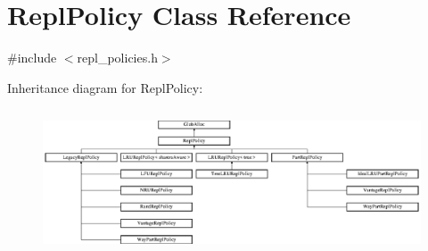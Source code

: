 \hypertarget{classReplPolicy}{\section{Repl\-Policy Class Reference}
\label{classReplPolicy}
}


{\ttfamily \#include $<$repl\-\_\-policies.\-h$>$}

Inheritance diagram for Repl\-Policy\-:\begin{figure}[H]
\begin{center}
\leavevmode
\includegraphics[height=4.328502cm]{classReplPolicy}
\end{center}
\end{figure}
